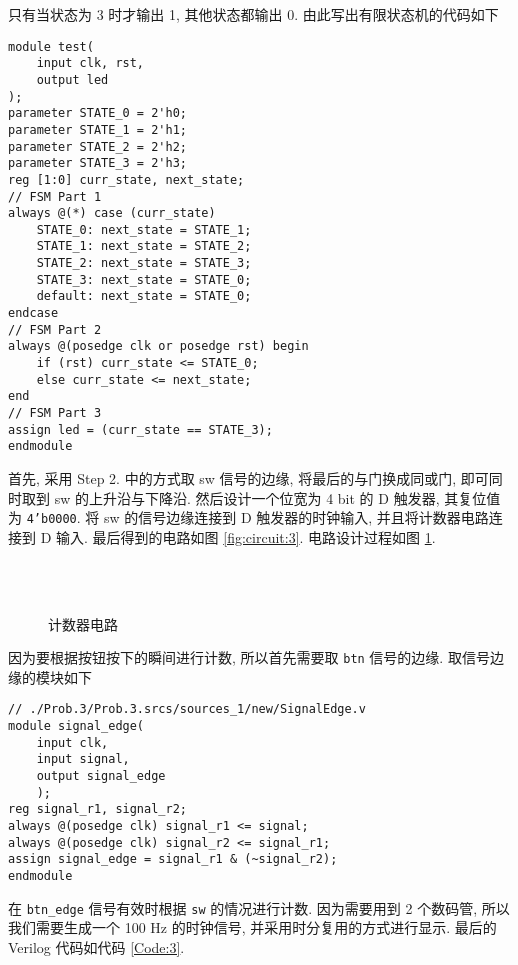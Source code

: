 \documentclass[UTF8,fontset=fandol]{ctexart}
\begin{document}
\begin{ExQuestions}
  只有当状态为 3 时才输出 1, 其他状态都输出 0. 由此写出有限状态机的代码如下
  \begin{lstlisting}[style = verilogstyle, caption = {Step 5. 中代码改写为有限状态机的形式}]
module test(
    input clk, rst,
    output led
);
parameter STATE_0 = 2'h0;
parameter STATE_1 = 2'h1;
parameter STATE_2 = 2'h2;
parameter STATE_3 = 2'h3;
reg [1:0] curr_state, next_state;
// FSM Part 1
always @(*) case (curr_state)
    STATE_0: next_state = STATE_1;
    STATE_1: next_state = STATE_2;
    STATE_2: next_state = STATE_3;
    STATE_3: next_state = STATE_0;
    default: next_state = STATE_0;
endcase
// FSM Part 2
always @(posedge clk or posedge rst) begin
    if (rst) curr_state <= STATE_0;
    else curr_state <= next_state;
end
// FSM Part 3
assign led = (curr_state == STATE_3);
endmodule
  \end{lstlisting}
  \question 首先, 采用 Step 2. 中的方式取 sw 信号的边缘, 将最后的与门换成同或门, 即可同时取到 sw 的上升沿与下降沿.
  然后设计一个位宽为 4 bit 的 D 触发器, 其复位值为 \texttt{4'b0000}. 将 sw 的信号边缘连接到 D 触发器的时钟输入, 
  并且将计数器电路连接到 D 输入. 最后得到的电路如图 \ref{fig:circuit:3}. 电路设计过程如图 \ref{fig:circuit}.
  \begin{figure}[!htbp]
      \centering
      \\
      \\
      \caption{计数器电路}
      \label{fig:circuit}
  \end{figure}
  \question 因为要根据按钮按下的瞬间进行计数, 所以首先需要取 \texttt{btn} 信号的边缘. 取信号边缘的模块如下
  \begin{lstlisting}[style = verilogstyle, caption = {取信号边缘的模块}, label = {Code:2}]
// ./Prob.3/Prob.3.srcs/sources_1/new/SignalEdge.v
module signal_edge(
    input clk,
    input signal,
    output signal_edge
    );
reg signal_r1, signal_r2;
always @(posedge clk) signal_r1 <= signal;
always @(posedge clk) signal_r2 <= signal_r1;
assign signal_edge = signal_r1 & (~signal_r2);
endmodule
  \end{lstlisting}
  在 \texttt{btn\_edge} 信号有效时根据 \texttt{sw} 的情况进行计数.
  因为需要用到 2 个数码管, 所以我们需要生成一个 100 Hz 的时钟信号, 并采用时分复用的方式进行显示.
  最后的 Verilog 代码如代码 \ref{Code:3}. 
  \begin{lstlisting}[style = verilogstyle, caption = {题目 3. 的 Verilog 代码}, label = {Code:3}]

\end{lstlisting}
\end{ExQuestions}
\end{document}
